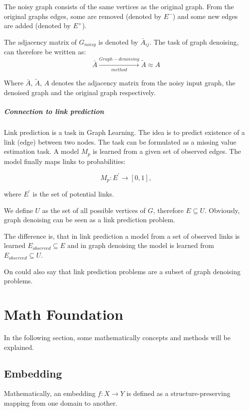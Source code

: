 The noisy graph consists of the same vertices as the original graph. From
the original graphs edges, some are removed (denoted by $E^{-}$) and some new edges are added
(denoted by $E^{+}$).

The adjacency matrix of $G_{noisy}$ is denoted by $\bar{A}_{ij}$.
The task of graph denoising, can therefore be written as:
\begin{equation}
    \bar{A} \xrightarrow[method]{Graph-denoising} \tilde{A} \approx A
\end{equation}

Where $\bar{A}$, $\tilde{A}$, $A$ denotes the adjacency matrix from the noisy input graph, the denoised
 graph and the original graph respectively.

\subparagraph{Connection to link prediction}
Link prediction is a task in Graph Learning. 
The idea is to predict existence of a link (edge) between two nodes.
The task can be formulated as a missing value estimation task. A model $M_p$ is learned
from a given set of observed edges. The model finally maps links to probabilities:


\begin{equation}
    M_p : E^{\prime} \rightarrow [0,1],
\end{equation}

where $E^{\prime}$ is the set of potential links.

We define $U$ as the set of all possible vertices of $G$, therefore $E \subseteq U$.
Obviously, graph denoising can be seen as a link prediction problem.

The difference is, that in link prediction a model from a set of observed links is learned
$E_{observed} \subseteq E$ and in graph denoising the model is learned from 
$E_{observed} \subseteq U$. 

On could also say that link prediction problems are a subset of graph denoising problems.


\section{Math Foundation}
In the following section, some mathematically concepts and methods will be explained.

\subsection{Embedding}
Mathematically, an embedding $f: X \rightarrow Y$ is defined as a structure-preserving mapping from one domain to another.

